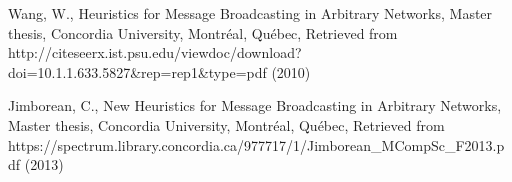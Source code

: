 \begin{thebibliography}{}
Wang, W.,
Heuristics for Message Broadcasting in Arbitrary Networks,
Master thesis, Concordia University, Montr\'eal, Qu\'ebec, 
Retrieved from http://citeseerx.ist.psu.edu/viewdoc/download?doi=10.1.1.633.5827\&rep=rep1\&type=pdf (2010)

Jimborean, C.,
New Heuristics for Message Broadcasting in Arbitrary Networks,
Master thesis, Concordia University, Montr\'eal, Qu\'ebec, 
Retrieved from https://spectrum.library.concordia.ca/977717/1/Jimborean\_MCompSc\_F2013.pdf (2013)


\end{thebibliography}



